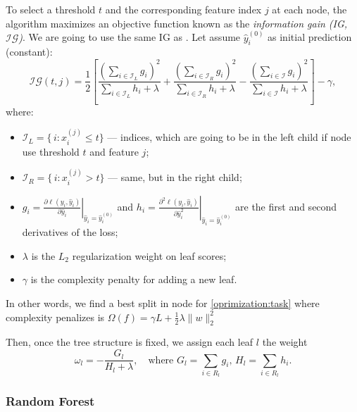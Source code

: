 To select a threshold \( t \) and the corresponding feature index \( j \) at each node, the algorithm maximizes an objective function known as the \emph{information gain (IG, \(\mathcal{IG}\))}. We are going to use the same IG as \cite{chenXGBoostScalableTree2016a}. Let assume \(\hat{y}_i^{(0)}\) as initial prediction (constant):
\[
    \mathcal{IG}(t, j)
    =
    \frac{1}{2}
    \left[
        \frac{\left(\sum_{i\in \mathcal{I}_L} g_i\right)^2}{\sum_{i\in \mathcal{I}_L} h_i + \lambda}
        +
        \frac{\left(\sum_{i\in \mathcal{I}_R} g_i\right)^2}{\sum_{i\in \mathcal{I}_R} h_i + \lambda}
        -
        \frac{\left(\sum_{i\in \mathcal{I}} g_i\right)^2}{\sum_{i\in \mathcal{I}} h_i + \lambda}
        \right]
    -
    \gamma,
\]
where:
\begin{itemize}
    \item \(\mathcal{I}_L = \{\,i: x_{i}^{(j)} \le t\}\) --- indices, which are going to be in the left child if node use threshold \(t\) and feature \(j\);
    \item \(\mathcal{I}_R = \{\,i: x_{i}^{(j)} > t\}\) --- same, but in the right child;
    \item \(g_i = \left.\frac{\partial \ell(y_i, \hat{y}_i)}{\partial \hat{y}_i}\right|_{\hat y_i = \hat{y}_i^{(0)}}\) and
          \(h_i = \left.\frac{\partial^2 \ell(y_i, \hat{y}_i)}{\partial \hat{y}_i^2}\right|_{\hat y_i = \hat{y}_i^{(0)}}\) are the first and second derivatives of the loss;
    \item \(\lambda\) is the \(L_2\) regularization weight on leaf scores;
    \item \(\gamma\) is the complexity penalty for adding a new leaf.
\end{itemize}

In other words, we find a best split in node for \ref{oprimization:task} where complexity penalizes is \(\Omega(f) = \gamma{L} + \frac{1}{2}\lambda\| w \|^2_2\)

Then, once the tree structure is fixed, we assign each leaf \(l\) the weight
\[
    \omega_l
    =
    -\frac{G_l}{H_l + \lambda},
    \quad
    \text{where }
    G_l = \sum_{i \in R_l} g_i,\, H_l = \sum_{i \in R_l} h_i.
\]

\subsubsection{Random Forest}
\label{model:random-forest}

